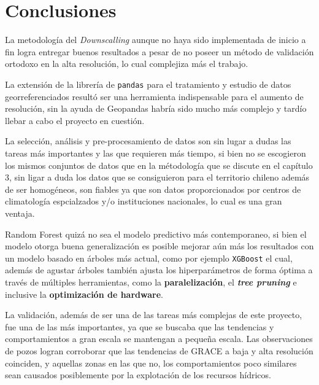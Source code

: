 \chapter{Conclusiones}
\label{C6}

La metodología del \textit{Downscalling} aunque no haya sido implementada de inicio a fin logra entregar buenos resultados a pesar de no poseer un método de validación ortodoxo en la alta resolución, lo cual
complejiza más el trabajo.

La extensión de la librería de \texttt{pandas} para el tratamiento y estudio de datos georreferenciados resultó ser una herramienta indispensable para el aumento de resolución, sin la ayuda de Geopandas habría sido
mucho más complejo y tardío llebar a cabo el proyecto en cuestión.

La selección, análisis y pre-procesamiento de datos son sin lugar a dudas las tareas más importantes y las que requieren más tiempo, si bien no se escogieron los mismos conjuntos de datos que en la métodología que se discute 
en el capítulo 3, sin ligar a duda los datos que se consiguieron para el territorio chileno además de ser homogéneos, son fiables ya que son datos proporcionados por centros de climatología espcialzados y/o instituciones nacionales, lo cual
es una gran ventaja.

Random Forest quizá no sea el modelo predictivo más contemporaneo, si bien el modelo otorga buena generalización es posible mejorar aún más los resultados con un modelo basado en árboles más actual, como por ejemplo \texttt{XGBoost} el cual, además de agustar árboles
también ajusta los hiperparámetros de forma óptima a través de múltiples herramientas, como la \textbf{paralelización}, el \textit{\textbf{tree pruning}} e inclusive
la \textbf{optimización de hardware}.

La validación, además de ser una de las tareas más complejas de este proyecto, fue una de las más importantes, ya que se buscaba que las tendencias y comportamientos a gran escala se mantengan a pequeña escala. Las observaciones de pozos
logran corroborar que las tendencias de GRACE a baja y alta resolución coinciden, y aquellas zonas en las que no, los comportamientos poco similares sean causados posiblemente por la explotación de los recursos hídricos.
